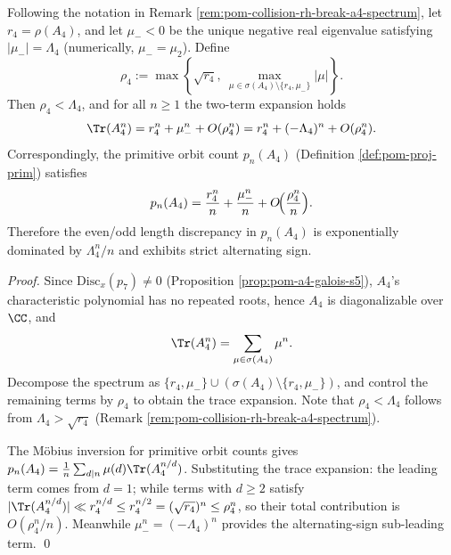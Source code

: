 \begin{proposition}\label{prop:pom-a4-trace-primitive-two-term}
Following the notation in Remark \ref{rem:pom-collision-rh-break-a4-spectrum}, let \(r_4=\rho(A_4)\), and let \(\mu_-<0\) be the unique negative real eigenvalue satisfying \(|\mu_-|=\Lambda_4\) (numerically, \(\mu_-=\mu_2\)).
Define
\[
\rho_4:=\max\!\left\{\sqrt{r_4},\ \max_{\mu\in\sigma(A_4)\setminus\{r_4,\mu_-\}}|\mu|\right\}.
\]
Then \(\rho_4<\Lambda_4\), and for all \(n\ge 1\) the two-term expansion holds
\[
\Tr(A_4^n)=r_4^n+\mu_-^n+O(\rho_4^n)
=r_4^n+(-\Lambda_4)^n+O(\rho_4^n).
\]
Correspondingly, the primitive orbit count \(p_n(A_4)\) (Definition \ref{def:pom-proj-prim}) satisfies
\[
p_n(A_4)=\frac{r_4^n}{n}+\frac{\mu_-^n}{n}+O\!\Bigl(\frac{\rho_4^n}{n}\Bigr).
\]
Therefore the even/odd length discrepancy in \(p_n(A_4)\) is exponentially dominated by \(\Lambda_4^n/n\) and exhibits strict alternating sign.
\end{proposition}
\begin{proof}
Since \(\mathrm{Disc}_x(p_7)\neq 0\) (Proposition \ref{prop:pom-a4-galois-s5}), \(A_4\)'s characteristic polynomial has no repeated roots, hence \(A_4\) is diagonalizable over \(\CC\), and
\[
\Tr(A_4^n)=\sum_{\mu\in\sigma(A_4)}\mu^n.
\]
Decompose the spectrum as \(\{r_4,\mu_-\}\cup(\sigma(A_4)\setminus\{r_4,\mu_-\})\), and control the remaining terms by \(\rho_4\) to obtain the trace expansion.
Note that \(\rho_4<\Lambda_4\) follows from \(\Lambda_4>\sqrt{r_4}\) (Remark \ref{rem:pom-collision-rh-break-a4-spectrum}).
\par
The Möbius inversion for primitive orbit counts gives
\(
p_n(A_4)=\frac{1}{n}\sum_{d\mid n}\mu(d)\Tr(A_4^{n/d})
\).
Substituting the trace expansion: the leading term comes from \(d=1\);
while terms with \(d\ge 2\) satisfy \(|\Tr(A_4^{n/d})|\ll r_4^{n/d}\le r_4^{n/2}=(\sqrt{r_4})^n\le \rho_4^n\),
so their total contribution is \(O(\rho_4^n/n)\).
Meanwhile \(\mu_-^n=(-\Lambda_4)^n\) provides the alternating-sign sub-leading term. \qed
\end{proof}


